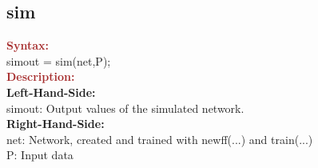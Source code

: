 \subsection{sim}

\noindent \textbf{\textcolor{brown}{Syntax:}}\\

\noindent simout = sim(net,P);\\

\noindent \textbf{\textcolor{brown}{Description:}}\\

\noindent  \textbf{Left-Hand-Side:}\\
\noindent simout: Output values of the simulated network.\\

\noindent  \textbf{Right-Hand-Side:}\\
\noindent net: Network, created and trained with newff(...) and train(...)\\
\noindent P: Input data\\ 




